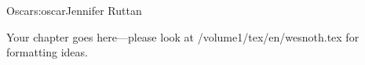 \begin{aosachapter}{Oscar}{s:oscar}{Jennifer Ruttan}

Your chapter goes here---please look at /volume1/tex/en/wesnoth.tex for 
formatting ideas.

\end{aosachapter}
